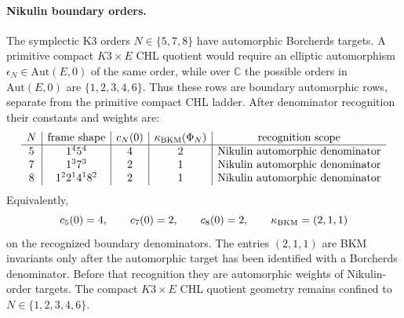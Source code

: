 \paragraph{Nikulin boundary orders.}
The symplectic K3 orders \(N\in\{5,7,8\}\) have automorphic Borcherds
targets.  A primitive compact \(K3\times E\) CHL quotient would require
an elliptic automorphism \(\epsilon_N\in\mathrm{Aut}(E,0)\) of the same
order, while over \(\mathbb C\) the possible orders in
\(\mathrm{Aut}(E,0)\) are \(\{1,2,3,4,6\}\).  Thus these rows are
boundary automorphic rows, separate from the primitive compact CHL
ladder.
After denominator recognition their constants and weights are:
\[
\begin{array}{c|c|c|c|c}
N & \text{frame shape} & c_N(0) & \kappa_{\mathrm{BKM}}(\Phi_N) & \text{recognition scope} \\ \hline
5 & 1^4 5^4 & 4 & 2 & \text{Nikulin automorphic denominator} \\
7 & 1^3 7^3 & 2 & 1 & \text{Nikulin automorphic denominator} \\
8 & 1^2 2^1 4^1 8^2 & 2 & 1 & \text{Nikulin automorphic denominator}
\end{array}
\]
Equivalently,
\[
  c_5(0)=4,\qquad c_7(0)=2,\qquad c_8(0)=2,
  \qquad
  \kappa_{\mathrm{BKM}}=(2,1,1)
\]
on the recognized boundary denominators.
The entries \((2,1,1)\) are BKM invariants only after the automorphic
target has been identified with a Borcherds denominator.  Before that
recognition they are automorphic weights of Nikulin-order targets.
The compact \(K3\times E\) CHL quotient geometry remains confined to
\(N\in\{1,2,3,4,6\}\).

